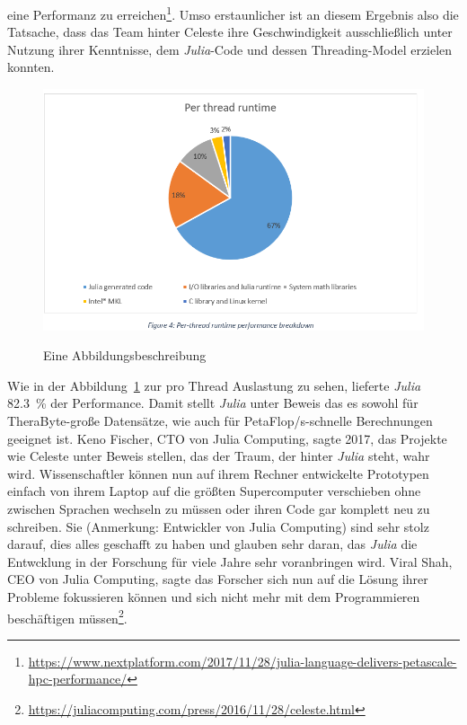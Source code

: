 \documentclass[proseminar,german,utf8]{zihpub}
\begin{document}
eine Performanz zu erreichen\footnote{\url{https://www.nextplatform.com/2017/11/28/julia-language-delivers-petascale-hpc-performance/}}. Umso erstaunlicher ist an diesem Ergebnis also die Tatsache, dass das Team hinter Celeste ihre Geschwindigkeit ausschließlich unter Nutzung ihrer Kenntnisse, dem \textit{Julia}-Code und dessen Threading-Model erzielen konnten.

\begin{figure}[hbt!]
  \centering
  \caption{Eine Abbildungsbeschreibung}
  \includegraphics[scale=0.5]{celestejulia.png}
  \label{fig:celestejulia}
\end{figure}

Wie in der Abbildung~\ref{fig:celestejulia} zur pro Thread Auslastung zu sehen, lieferte \textit{Julia} 82.3~\% der Performance. Damit stellt \textit{Julia} unter Beweis das es sowohl für TheraByte-große Datensätze, wie auch für PetaFlop/s-schnelle Berechnungen geeignet ist. Keno Fischer, CTO von Julia Computing, sagte 2017, das Projekte wie Celeste unter Beweis stellen, das der Traum, der hinter \textit{Julia} steht, wahr wird. Wissenschaftler können nun auf ihrem Rechner entwickelte Prototypen einfach von ihrem Laptop auf die größten Supercomputer verschieben ohne zwischen Sprachen wechseln zu müssen oder ihren Code gar komplett neu zu schreiben. Sie (Anmerkung: Entwickler von Julia Computing) sind sehr stolz darauf, dies alles geschafft zu haben und glauben sehr daran, das \textit{Julia} die Entwcklung in der Forschung für viele Jahre sehr voranbringen wird. Viral Shah, CEO von Julia Computing, sagte das Forscher sich nun auf die Lösung ihrer Probleme fokussieren können und sich nicht mehr mit dem Programmieren beschäftigen müssen\footnote{\url{https://juliacomputing.com/press/2016/11/28/celeste.html}}.
\end{document}

